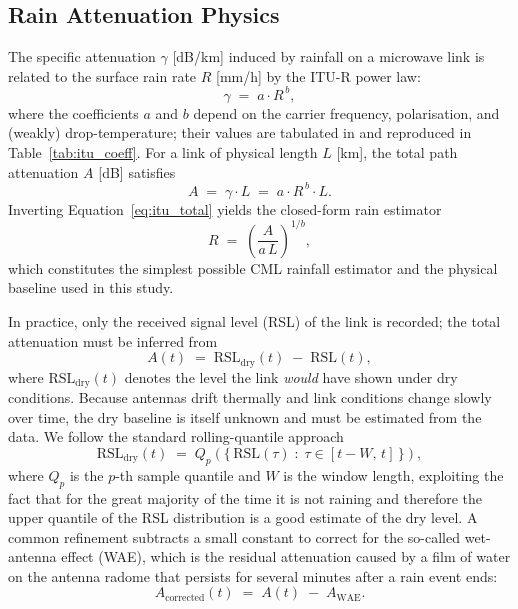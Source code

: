 \documentclass[12pt, a4paper]{article}
\begin{document}
\subsection{Rain Attenuation Physics}\label{sec:physics}

The specific attenuation \(\gamma\) [dB/km] induced by rainfall on a
microwave link is related to the surface rain rate \(R\) [mm/h] by the
ITU-R power law:
\begin{equation}
  \gamma \;=\; a \cdot R^{\,b}, \label{eq:itu_power}
\end{equation}
where the coefficients \(a\) and \(b\) depend on the carrier
frequency, polarisation, and (weakly) drop-temperature; their values
are tabulated in \cite{ituR838} and reproduced in
Table~\ref{tab:itu_coeff}. For a link of physical length \(L\) [km], the
total path attenuation \(A\) [dB] satisfies
\begin{equation}
  A \;=\; \gamma \cdot L \;=\; a \cdot R^{\,b} \cdot L. \label{eq:itu_total}
\end{equation}
Inverting Equation~\eqref{eq:itu_total} yields the closed-form rain
estimator
\begin{equation}
  R \;=\; \left(\frac{A}{a\,L}\right)^{1/b}, \label{eq:itu_inverse}
\end{equation}
which constitutes the simplest possible CML rainfall estimator and the
physical baseline used in this study.

In practice, only the received signal level (RSL) of the link is
recorded; the total attenuation must be inferred from
\begin{equation}
  A(t) \;=\; \mathrm{RSL}_{\text{dry}}(t) \;-\; \mathrm{RSL}(t), \label{eq:rsl_to_atten}
\end{equation}
where \(\mathrm{RSL}_{\text{dry}}(t)\) denotes the level the link
\emph{would} have shown under dry conditions. Because antennas drift
thermally and link conditions change slowly over time, the dry baseline
is itself unknown and must be estimated from the data. We follow the
standard rolling-quantile approach
\begin{equation}
  \mathrm{RSL}_{\text{dry}}(t) \;=\; Q_{p}\!\left(
     \{\,\mathrm{RSL}(\tau) \;:\; \tau \in [t-W,\,t]\,\}\right), \label{eq:baseline}
\end{equation}
where \(Q_{p}\) is the \(p\)-th sample quantile and \(W\) is the window
length, exploiting the fact that for the great majority of the time it
is not raining and therefore the upper quantile of the RSL distribution
is a good estimate of the dry level. A common refinement subtracts a
small constant to correct for the so-called wet-antenna effect (WAE),
which is the residual attenuation caused by a film of water on the
antenna radome that persists for several minutes after a rain event
ends:
\begin{equation}
  A_{\text{corrected}}(t) \;=\; A(t) \;-\; A_{\mathrm{WAE}}. \label{eq:wae}
\end{equation}
\end{document}
